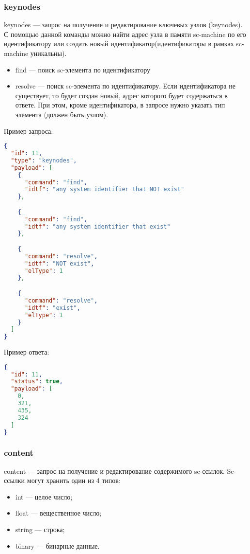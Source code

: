 \subsubsection{keynodes}
keynodes --- запрос на получение и редактирование ключевых узлов (keynodes).
С помощью данной команды можно найти адрес узла в памяти sc-machine по его идентификатору или создать новый идентификатор(идентификаторы в рамках sc-machine уникальны). 
\begin{itemize}
\item find --- поиск sc-элемента по идентификатору 
\item resolve --- поиск sc-элемента по идентификатору. Если идентификатора не существует, то будет создан новый, адрес которого будет содержаться в ответе. При этом, кроме идентификатора, в запросе нужно указать тип элемента (должен быть узлом).
\end{itemize}

Пример запроса:
\begin{lstlisting}[language=json,firstnumber=1]
{
  "id": 11,
  "type": "keynodes",
  "payload": [
    {
      "command": "find",
      "idtf": "any system identifier that NOT exist"
    },

    {
      "command": "find",
      "idtf": "any system identifier that exist"
    },

    {
      "command": "resolve",
      "idtf": "NOT exist",
      "elType": 1
    },

    {
      "command": "resolve",
      "idtf": "exist",
      "elType": 1
    }
  ]
}
\end{lstlisting}

Пример ответа:
\begin{lstlisting}[language=json,firstnumber=1]
{
  "id": 11,
  "status": true,
  "payload": [
    0,
    321,
    435,
    324
  ]
}
\end{lstlisting}


\subsubsection{content}
content --- запрос на получение и редактирование содержимого sc-ссылок. Sc-ссылки могут хранить один из 4 типов: 
\begin{itemize}
    \item int --- целое число;
    \item float --- вещественное число;
    \item string --- строка;
    \item binary --- бинарные данные.
\end{itemize}

